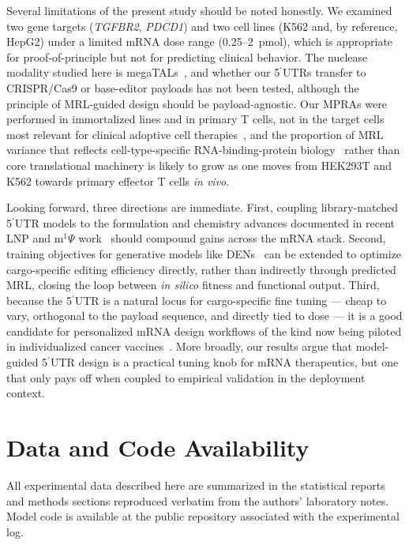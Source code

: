 \documentclass[11pt]{article}
\begin{document}
Several limitations of the present study should be noted honestly. We
examined two gene targets (\emph{TGFBR2}, \emph{PDCD1}) and two cell
lines (K562 and, by reference, HepG2) under a limited mRNA dose range
(0.25--2~pmol), which is appropriate for proof-of-principle but not
for predicting clinical behavior. The nuclease modality studied here
is megaTALs~\citep{gwiazda2016tcellediting,mcmurrough2018laglidadg,
laforet2019endonuclease}, and whether our 5$^\prime$UTRs transfer to
CRISPR/Cas9 or base-editor payloads has not been tested, although the
principle of MRL-guided design should be payload-agnostic. Our MPRAs
were performed in immortalized lines and in primary T cells, not in
the target cells most relevant for clinical adoptive cell
therapies~\citep{fix2022tgfbr2,mohammad2025pd1}, and the proportion of
MRL variance that reflects cell-type-specific RNA-binding-protein
biology~\citep{shikalov2021ddx3} rather than core translational
machinery is likely to grow as one moves from HEK293T and K562
towards primary effector T cells \emph{in vivo}.

Looking forward, three directions are immediate. First, coupling
library-matched 5$^\prime$UTR models to the formulation and
chemistry advances documented in recent LNP and m$^{1}\Psi$
work~\citep{tang2023smart5utr,kim2026lnp_utr,thomas2021bnt162b2}
should compound gains across the mRNA stack. Second, training
objectives for generative models like
DENs~\citep{linder2020den,linder2021fastseqprop} can be extended to
optimize cargo-specific editing efficiency directly, rather than
indirectly through predicted MRL, closing the loop between
\emph{in silico} fitness and functional output. Third, because the
5$^\prime$UTR is a natural locus for cargo-specific fine tuning ---
cheap to vary, orthogonal to the payload sequence, and directly tied
to dose --- it is a good candidate for personalized mRNA design
workflows of the kind now being piloted in
individualized cancer vaccines~\citep{sahin2026tnbcvaccine}. More
broadly, our results argue that model-guided 5$^\prime$UTR design
is a practical tuning knob for mRNA therapeutics, but one that
only pays off when coupled to empirical validation in the
deployment context.

\section*{Data and Code Availability}

All experimental data described here are summarized in the statistical
reports and methods sections reproduced verbatim from the authors'
laboratory notes. Model code is available at the public repository
associated with the experimental log.


\end{document}
